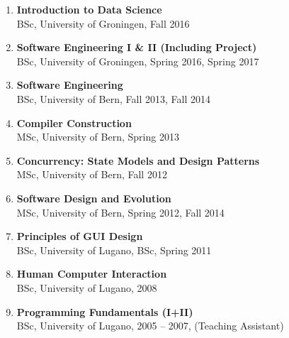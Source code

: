 \newcommand {\lecture}[3]{\item {\bf #1}\\#2, #3 }
\newcommand {\ug}{University of Groningen}
\newcommand {\ub}{University of Bern}
\newcommand {\ul}{University of Lugano}
\newcommand {\msc}{MSc, }
\newcommand {\bsc}{BSc, }

\newpage
{}
\begin{enumerate}
	\lecture{Introduction to Data Science}{\bsc \ug}{Fall 2016}
	\lecture{Software Engineering I \& II (Including Project)}{\bsc \ug}{Spring 2016, Spring 2017}
	\lecture{Software Engineering}{\bsc \ub}{Fall 2013, Fall 2014}
	\lecture {Compiler Construction}{\msc \ub}{Spring 2013}
	\lecture {Concurrency: State Models and Design Patterns}{\msc \ub}{Fall 2012}
	\lecture {Software Design and Evolution}{\msc \ub}{Spring 2012, Fall 2014}
	\lecture {Principles of GUI Design}{\bsc \ul}{\bsc Spring 2011}
	\lecture {Human Computer Interaction}{\bsc \ul}{2008}
	\lecture {Programming Fundamentals (I+II)}{\bsc \ul}{2005 -- 2007, (Teaching Assistant)}

\end{enumerate}
